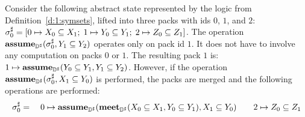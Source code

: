 \begin{example}
Consider the following abstract state represented by the logic from Definition~\ref{d:1:symsets}, lifted into three packs with ids $0$, $1$, and $2$:
$
  {\sigma}^{\sharp}_0 = [0 \mapsto X_0 \subseteq X_1; \; 1 \mapsto Y_0 \subseteq Y_1; \; 2 \mapsto Z_0 \subseteq Z_1]
$.
The operation $\textbf{assume}_{{\mathbb{D}}^{\sharp}}({\sigma}^{\sharp}_0, Y_1 \subseteq Y_2)$ operates only on pack id $1$.  It does not have to involve any computation on packs $0$ or $1$.  The resulting pack $1$ is: $1 \mapsto \textbf{assume}_{{\mathbb{D}}^{\sharp}}(Y_0 \subseteq Y_1, Y_1 \subseteq Y_2)$.  However, if the operation $\textbf{assume}_{{\mathbb{D}}^{\sharp}}({\sigma}^{\sharp}_0, X_1 \subseteq Y_0)$ is performed, the packs are merged and the following operations are performed:
\begin{align*}
{\sigma}^{\sharp}_0 = \quad 0 \mapsto \textbf{assume}_{{\mathbb{D}}^{\sharp}}(\textbf{meet}_{{\mathbb{D}}^{\sharp}}(X_0 \subseteq X_1, Y_0 \subseteq Y_1), X_1 \subseteq Y_0) \qquad 2 \mapsto Z_0 \subseteq Z_1
\end{align*}
\end{example}